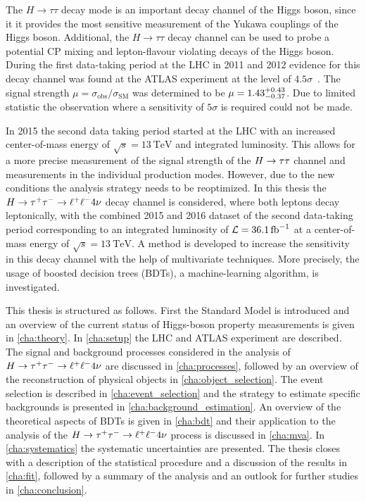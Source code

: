 The $H \to \tau\tau$ decay mode is an important decay channel of the Higgs boson, since it it provides the most sensitive measurement
of the Yukawa couplings of the Higgs boson.
Additional, the $H \to \tau\tau$ decay channel can be used to probe a potential CP mixing and lepton-flavour violating decays of the Higgs boson.
During the first data-taking period at the LHC in 2011 and 2012 evidence for this decay channel was found at the ATLAS experiment
at the level of $4.5\sigma$~\cite{HTauTauRun1}.
The signal strength $\mu = \sigma_\text{obs} / \sigma_\text{SM}$ was determined to be $\mu = 1.43{}^{+{0.43}}_{-{0.37}}$.
Due to limited statistic the observation where a sensitivity of $5\sigma$ is required could not be made.

In 2015 the second data taking period started at the LHC with an increased center-of-mass energy of $\sqrt{s} = \SI{13}{\TeV}$ and integrated luminosity.
This allows for a more precise measurement of the signal strength of the $H \to \tau \tau$ channel and measurements in the individual production modes.
However, due to the new conditions the analysis strategy needs to be reoptimized.
In this thesis the $H \to \tau^+\tau^- \to \ell^+\ell^- 4\nu$ decay channel is considered, where both leptons decay leptonically, with the
combined 2015 and 2016 dataset of the second data-taking period corresponding to an integrated luminosity of $\lumi = \SI{36.1}{\invfb}$
at a center-of-mass energy of $\sqrt{s} = \SI{13}{\TeV}$.
A method is developed to increase the sensitivity in this decay channel with the help of multivariate techniques.
More precisely, the usage of boosted decision trees (BDTs), a machine-learning algorithm, is investigated.

This thesis is structured as follows.
First the Standard Model is introduced and an overview of the current status of Higgs-boson property measurements is given in \cref{cha:theory}.
In \cref{cha:setup} the LHC and ATLAS experiment are described.
The signal and background processes considered in the analysis of $H \to \tau^+\tau^- \to \ell^+\ell^- 4\nu$ are discussed in \cref{cha:processes}, followed by an overview
of the reconstruction of physical objects in \cref{cha:object_selection}.
The event selection is described in \cref{cha:event_selection} and the strategy to estimate specific backgrounds
is presented in \cref{cha:background_estimation}.
An overview of the theoretical aspects of BDTs is given in \cref{cha:bdt} and their application to the analysis of the $H \to \tau^+\tau^- \to \ell^+\ell^- 4\nu$ process
is discussed in \cref{cha:mva}.
In \cref{cha:systematics} the systematic uncertainties are presented.
The thesis closes with a description of the statistical procedure and a discussion of the results in \cref{cha:fit}, followed
by a summary of the analysis and an outlook for further studies in \cref{cha:conclusion}.
